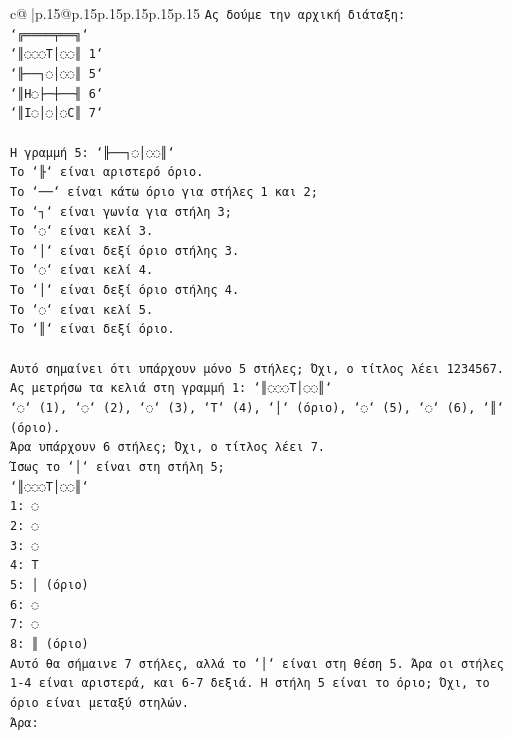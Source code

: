 \documentclass{article}
\begin{document}
{\begin{supertabular}{c@{$\;$}|p{.15\linewidth}@{}p{.15\linewidth}p{.15\linewidth}p{.15\linewidth}p{.15\linewidth}p{.15\linewidth}}
{{{\texttt{Ας δούμε την αρχική διάταξη:} \\
\texttt{`╔════╤══╗`} \\
\texttt{`║◌◌◌T│◌◌║ 1`} \\
\texttt{`╟──┐◌│◌◌║ 5`} \\
\texttt{`║H◌├─┼──╢ 6`} \\
\texttt{`║I◌│◌│◌C║ 7`} \\
\\ 
\texttt{Η γραμμή 5: `╟──┐◌│◌◌║`} \\
\texttt{Το `╟` είναι αριστερό όριο.} \\
\texttt{Το `──` είναι κάτω όριο για στήλες 1 και 2;} \\
\texttt{Το `┐` είναι γωνία για στήλη 3;} \\
\texttt{Το `◌` είναι κελί 3.} \\
\texttt{Το `│` είναι δεξί όριο στήλης 3.} \\
\texttt{Το `◌` είναι κελί 4.} \\
\texttt{Το `│` είναι δεξί όριο στήλης 4.} \\
\texttt{Το `◌` είναι κελί 5.} \\
\texttt{Το `║` είναι δεξί όριο.} \\
\\ 
\texttt{Αυτό σημαίνει ότι υπάρχουν μόνο 5 στήλες; Όχι, ο τίτλος λέει 1234567.} \\
\texttt{Ας μετρήσω τα κελιά στη γραμμή 1: `║◌◌◌T│◌◌║`} \\
\texttt{`◌` (1), `◌` (2), `◌` (3), `T` (4), `│` (όριο), `◌` (5), `◌` (6), `║` (όριο).} \\
\texttt{Άρα υπάρχουν 6 στήλες; Όχι, ο τίτλος λέει 7.} \\
\texttt{Ίσως το `│` είναι στη στήλη 5;} \\
\texttt{`║◌◌◌T│◌◌║`} \\
\texttt{1: ◌} \\
\texttt{2: ◌} \\
\texttt{3: ◌} \\
\texttt{4: T} \\
\texttt{5: │ (όριο)} \\
\texttt{6: ◌} \\
\texttt{7: ◌} \\
\texttt{8: ║ (όριο)} \\
\texttt{Αυτό θα σήμαινε 7 στήλες, αλλά το `│` είναι στη θέση 5. Άρα οι στήλες 1{-}4 είναι αριστερά, και 6{-}7 δεξιά. Η στήλη 5 είναι το όριο; Όχι, το όριο είναι μεταξύ στηλών.} \\
\texttt{Άρα:} \\
}}}
\end{supertabular}}
\end{document}
